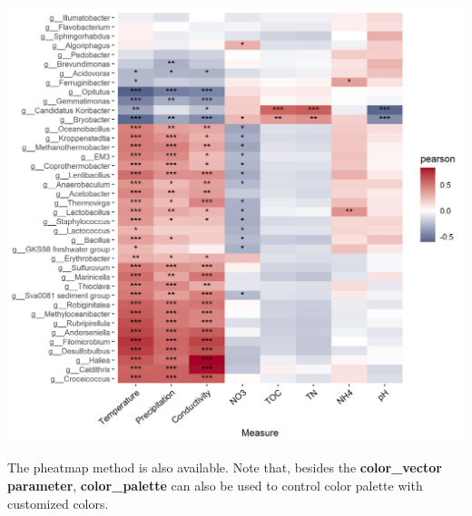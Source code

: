 \documentclass[
]{book}
\newenvironment{Shaded}{\begin{snugshade}}{\end{snugshade}}
\newcommand{\AttributeTok}[1]{\textcolor[rgb]{0.77,0.63,0.00}{#1}}
\newcommand{\CommentTok}[1]{\textcolor[rgb]{0.56,0.35,0.01}{\textit{#1}}}
\newcommand{\ConstantTok}[1]{\textcolor[rgb]{0.00,0.00,0.00}{#1}}
\newcommand{\DecValTok}[1]{\textcolor[rgb]{0.00,0.00,0.81}{#1}}
\newcommand{\FunctionTok}[1]{\textcolor[rgb]{0.00,0.00,0.00}{#1}}
\newcommand{\NormalTok}[1]{#1}
\newcommand{\SpecialCharTok}[1]{\textcolor[rgb]{0.00,0.00,0.00}{#1}}
\newcommand{\StringTok}[1]{\textcolor[rgb]{0.31,0.60,0.02}{#1}}
\begin{document}
\begin{center}\includegraphics[width=700px]{Images/plot_corr_ggplot} \end{center}

The pheatmap method is also available.
Note that, besides the \textbf{color\_vector parameter},
\textbf{color\_palette} can also be used to control color palette with customized colors.

\begin{Shaded}
\end{Shaded}
\end{document}
